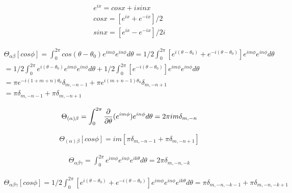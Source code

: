 \documentclass{Note}
\begin{document}
\begin{equation}
\begin{aligned}
e^{ix}=cosx+isinx\\
cosx=[e^{ix}+e^{-ix}]/2\\
sinx=[e^{ix}-e^{-ix}]/2i
\end{aligned}
\end{equation}

\begin{equation}
\begin{aligned}
\Theta_{\alpha\beta}[cos\phi]=\int_0^{2\pi} cos(\theta-\theta_0) e^{im\phi} e^{in\phi} d\theta=1/2\int_0^{2\pi} [e^{i(\theta-\theta_0)}+e^{-i(\theta-\theta_0)}] e^{im\phi} e^{in\phi} d\theta\\
=1/2\int_0^{2\pi} e^{i(\theta-\theta_0)} e^{im\phi} e^{in\phi} d\theta+1/2\int_0^{2\pi} [e^{-i(\theta-\theta_0)}] e^{im\phi} e^{in\phi} d\theta\\
=\pi e^{-i(1+m+n)\theta_0}\delta_{m,-n-1}+\pi e^{i(m+n-1)\theta_0}\delta_{m,-n+1}\\
=\pi \delta_{m,-n-1}+\pi \delta_{m,-n+1}
\end{aligned}
\end{equation}


\begin{equation}
\begin{aligned}
\Theta_{(\alpha)\beta}=\int_0^{2\pi} {\partial \over \partial \theta}(e^{im\phi}) e^{in\phi} d\theta
=2\pi im \delta_{m,-n}
\end{aligned}
\end{equation}


\begin{equation}
\begin{aligned}
\Theta_{(\alpha)\beta}[cos\phi]=im[ \pi \delta_{m,-n-1}+\pi \delta_{m,-n+1}]
\end{aligned}
\end{equation}

\begin{equation}
\begin{aligned}
\Theta_{\alpha\beta\gamma}=\int_0^{2\pi} e^{im\phi} e^{in\phi}  e^{ik\theta} d\theta
=2\pi \delta_{m,-n,-k}
\end{aligned}
\end{equation}

\begin{equation}
\begin{aligned}
\Theta_{\alpha\beta\gamma}[cos\phi]=1/2 \int_0^{2\pi} [e^{i(\theta-\theta_0)}+e^{-i(\theta-\theta_0)}]  e^{im\phi} e^{in\phi}  e^{ik\theta} d\theta
=\pi \delta_{m,-n,-k-1}+\pi \delta_{m,-n,-k+1}
\end{aligned}
\end{equation}
\end{document}
